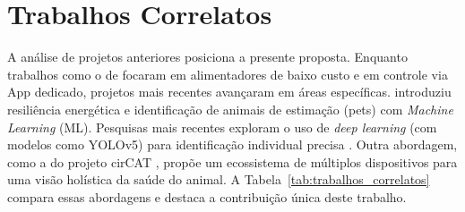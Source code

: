 \section{Trabalhos Correlatos}
A análise de projetos anteriores posiciona a presente proposta.
Enquanto trabalhos como o de \cite{rodrigues2019} focaram em alimentadores de baixo custo e \cite{alves2020} em controle via App dedicado, projetos mais recentes avançaram em áreas específicas.
\cite{jacomini2024} introduziu resiliência energética e identificação de animais de estimação (pets) com \textit{Machine Learning} (ML).
Pesquisas mais recentes exploram o uso de \textit{deep learning} (com modelos como YOLOv5) para identificação individual precisa \cite{yolov5_pet_feeder, yolov5_wildlife}.
Outra abordagem, como a do projeto cirCAT \cite{circat_paper}, propõe um ecossistema de múltiplos dispositivos para uma visão holística da saúde do animal.
A Tabela~\ref{tab:trabalhos_correlatos} compara essas abordagens e destaca a contribuição única deste trabalho.
